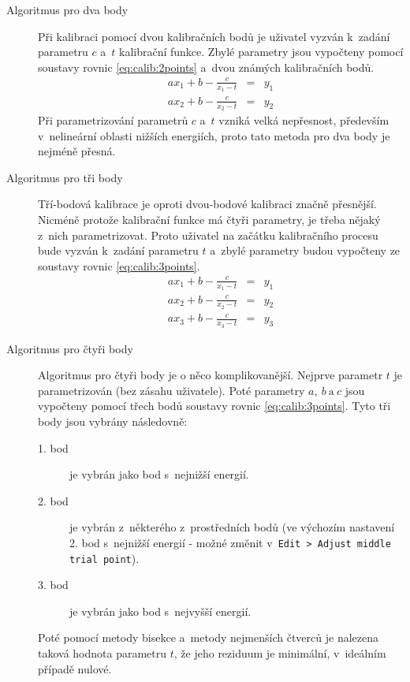 \begin{description}
	\item[Algoritmus pro dva body]
	Při kalibraci pomocí dvou kalibračních bodů je uživatel vyzván k~zadání parametru $c$ a~$t$ kalibrační funkce. Zbylé parametry jsou vypočteny pomocí soustavy rovnic \ref{eq:calib:2points} a~dvou známých kalibračních bodů.
	\begin{eqnarray}\label{eq:calib:2points}
		ax_{1} + b - \frac{c}{x_{1}-t} &=& y_{1} \\
		ax_{2} + b - \frac{c}{x_{2}-t} &=& y_{2} \nonumber 
	\end{eqnarray}
	Při parametrizování parametrů $c$ a~$t$ vzniká velká nepřesnost, především v~nelineární oblasti nižších energiích, proto tato metoda pro dva body je nejméně přesná.

	\item[Algoritmus pro tři body]
	Tří-bodová kalibrace je oproti dvou-bodové kalibraci značně přesnější. Nicméně protože kalibrační funkce má čtyři parametry, je třeba nějaký z~nich parametrizovat. Proto uživatel na začátku kalibračního procesu bude vyzván k~zadání parametru $t$ a~zbylé parametry budou vypočteny ze soustavy rovnic \ref{eq:calib:3points}.
	\begin{eqnarray}\label{eq:calib:3points}
		ax_{1} + b - \frac{c}{x_{1}-t} &=& y_{1} \nonumber \\
		ax_{2} + b - \frac{c}{x_{2}-t} &=& y_{2} \\
		ax_{3} + b - \frac{c}{x_{3}-t} &=& y_{3}\nonumber 
	\end{eqnarray}

	\item[Algoritmus pro čtyři body]
	Algoritmus pro čtyři body je o něco komplikovanější. Nejprve parametr $t$ je parametrizován (bez zásahu uživatele). Poté parametry $a,~b~\text{a}~c$ jsou vypočteny pomocí třech bodů soustavy rovnic \ref{eq:calib:3points}. Tyto tři body jsou vybrány následovně:
	\begin{description}
		\item[1. bod] je vybrán jako bod s~nejnižší energií.
		\item[2. bod] je vybrán z~některého z~prostředních bodů (ve výchozím nastavení 2. bod s~nejnižší energií - možné změnit v~\texttt{Edit > Adjust middle trial point}).
		\item[3. bod] je vybrán jako bod s~nejvyšší energií.
	\end{description}

	Poté pomocí metody bisekce a~metody nejmenších čtverců je nalezena taková hodnota parametru $t$, že jeho reziduum je minimální, v~ideálním případě nulové.


\end{description}
